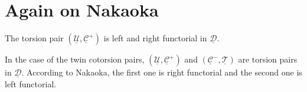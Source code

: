 \clearpage

\section{Again on Nakaoka}

\begin{lemma}\label{sec3:lem1}
  The torsion pair $(\underline{\mathcal{U}}, \underline{\mathcal{C}}^+)$ is left and right functorial
  in $\underline{\mathcal{D}}$.
\end{lemma}

\begin{lemma}\label{sec3:lem2}
  In the case of the twin cotorsion pairs, $(\underline{\mathcal{U}},\underline{\mathcal{C}}^+)$ and
  $(\underline{\mathcal{C}}^-,\underline{\mathcal{T}})$ are torsion pairs in $\underline{\mathcal{D}}$.
  According to Nakaoka, the first one is right functorial and the second one is left
  functorial.
\end{lemma}
